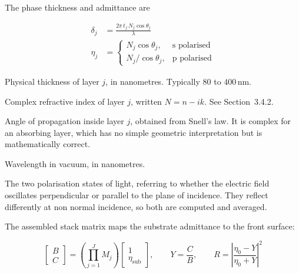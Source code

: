 \documentclass[11pt,a4paper]{article}
\newcommand{\nm}{\ensuremath{\,\mathrm{nm}}}
\newenvironment{symlist}
  {\vspace{-0.2em}\begin{list}{}{%
    \setlength{\leftmargin}{2.4em}\setlength{\labelwidth}{2.0em}%
    \setlength{\labelsep}{0.4em}\setlength{\itemsep}{1pt}%
    \setlength{\parsep}{0pt}\setlength{\topsep}{3pt}%
    \renewcommand{\makelabel}[1]{##1\hfil}}}
  {\end{list}}
\begin{document}
The phase thickness and admittance are

\begin{align}
\delta_j &= \frac{2\pi\, t_j\, N_j \cos\theta_j}{\lambda} \label{eq:phase}\\[0.5em]
\eta_j &=
\begin{cases}
N_j \cos\theta_j, & \text{s polarised}\\[0.4em]
N_j / \cos\theta_j, & \text{p polarised}
\end{cases}
\label{eq:admit}
\end{align}

\begin{symlist}
\item[$t_j$] Physical thickness of layer $j$, in nanometres. Typically 80 to
$400\nm$.
\item[$N_j$] Complex refractive index of layer $j$, written $N = n - ik$. See
Section~3.4.2.
\item[$\theta_j$] Angle of propagation inside layer $j$, obtained from Snell's
law. It is complex for an absorbing layer, which has no simple geometric
interpretation but is mathematically correct.
\item[$\lambda$] Wavelength in vacuum, in nanometres.
\item[s, p] The two polarisation states of light, referring to whether the
electric field oscillates perpendicular or parallel to the plane of incidence.
They reflect differently at non normal incidence, so both are computed and
averaged.
\end{symlist}

The assembled stack matrix maps the substrate admittance to the front surface:

\begin{equation}
\begin{bmatrix} B\\ C\end{bmatrix}
= \left(\prod_{j=1}^{J} M_j\right)\begin{bmatrix} 1\\ \eta_\mathrm{sub}\end{bmatrix},
\qquad
Y = \frac{C}{B},
\qquad
R = \left|\frac{\eta_0 - Y}{\eta_0 + Y}\right|^2
\label{eq:tmm}
\end{equation}
\end{document}
